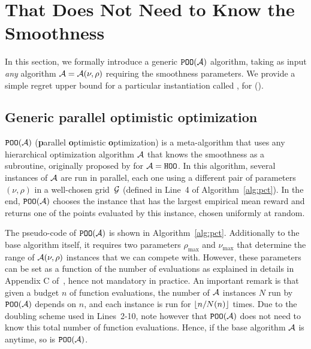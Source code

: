 \section{\texorpdfstring{\PCT}{} That Does Not Need to Know the Smoothness}\label{sec:gpo.pct}

In this section, we formally introduce a generic $\texttt{POO}(\mathcal{A})$ algorithm, taking as input \emph{any} algorithm $\mathcal{A}=\mathcal{A}(\nu,\rho)$ requiring the smoothness parameters. We provide a simple regret upper bound for a particular instantiation called \PCT, for \POO\!(\HCT).

\subsection{Generic parallel optimistic optimization}

$\texttt{POO}(\mathcal{A})$ (\textbf{p}arallel \textbf{o}ptimistic \textbf{o}ptimization) is a meta-algorithm that uses any hierarchical optimization algorithm $\mathcal{A}$ that knows the smoothness as a subroutine, originally proposed by \cite{grill2015poo} for $\mathcal{A} = \texttt{HOO}$. In this algorithm, several instances of $\mathcal{A}$ are run in parallel, each one using a different pair of parameters $(\nu,\rho)$ in a well-chosen grid~$\mathcal{G}$ (defined in Line~4 of Algorithm~\ref{alg:pct}). In the end, $\texttt{POO}(\mathcal{A})$ chooses the instance that has the largest empirical mean reward and returns one of the points evaluated by this instance, chosen uniformly at random.

The pseudo-code of $\texttt{POO}(\mathcal{A})$ is shown in Algorithm~\ref{alg:pct}. Additionally to the base algorithm itself, it requires two parameters $\rho_{\max}$ and $\nu_{\max}$ that determine the range of $\mathcal{A}(\nu,\rho)$ instances that we can compete with. However, these parameters can be set as a function of the number of evaluations as explained in details in Appendix C of~\cite{grill2015poo}, hence not mandatory in practice. An important remark is that given a budget $n$ of function evaluations, the number of $\mathcal{A}$ instances $N$ run by $\texttt{POO}(\mathcal{A})$ depends on $n$, and each instance is run for $\lfloor n/N(n)\rfloor$ times. Due to the doubling scheme used in Lines~2-10, note however that $\texttt{POO}(\mathcal{A})$ does not need to know this total number of function evaluations. Hence, if the base algorithm $\mathcal{A}$ is anytime, so is $\texttt{POO}(\mathcal{A})$.

